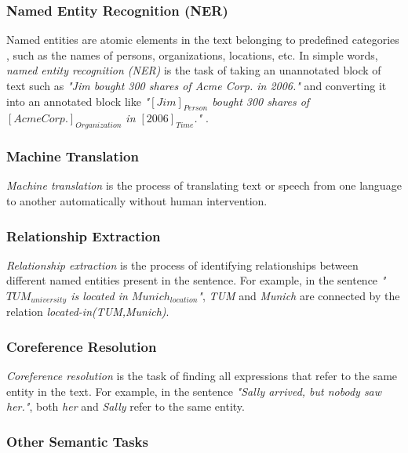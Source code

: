 \subsubsection{Named Entity Recognition (NER)}

Named entities are atomic elements in the text belonging to predefined categories \cite{ner1}, such as the names of persons, organizations, locations, etc. In simple words, \textit{named entity recognition (NER)} is the task of taking an unannotated block of text such as \textit{"Jim bought 300 shares of Acme Corp. in 2006."} and converting it into an annotated block like \textit{"$[Jim]_{Person}$ bought 300 shares of $[Acme Corp.]_{Organization}$ in $[2006]_{Time}$."} \cite{wiki:ner}.

\subsubsection{Machine Translation}

\textit{Machine translation} is the process of translating text or speech from one language to another automatically without human intervention.

\subsubsection{Relationship Extraction}\label{sec:RE}

\textit{Relationship extraction} is the process of identifying relationships between different named entities present in the sentence. For example, in the sentence \textit{"$TUM_{university}$ is located in $Munich_{location}$"}, \textit{TUM} and \textit{Munich} are connected by the relation \textit{located-in(TUM,Munich)}.

\subsubsection{Coreference Resolution}

\textit{Coreference resolution} is the task of finding all expressions that refer to the same entity in the text. For example, in the sentence \textit{"Sally arrived, but nobody saw her."}, both \textit{her} and \textit{Sally} refer to the same entity.

\subsubsection{Other Semantic Tasks}

